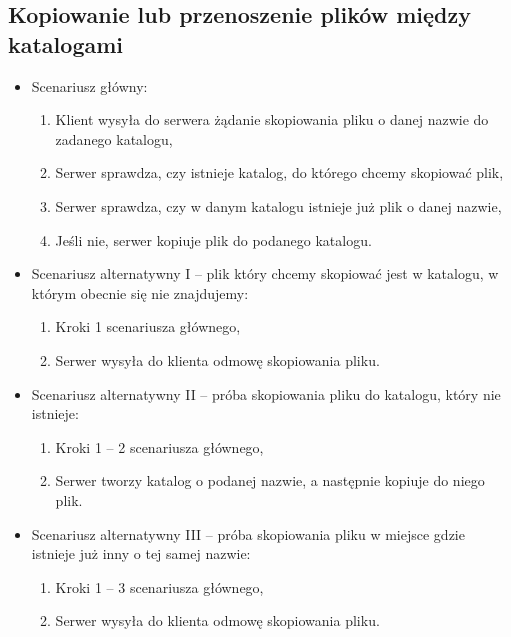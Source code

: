 \documentclass[10pt,a4paper]{article}
\begin{document}
\subsection{Kopiowanie lub przenoszenie plików między katalogami}
\begin{itemize}
    \item Scenariusz główny:
    \begin{enumerate}
        \item Klient wysyła do serwera żądanie skopiowania pliku o danej nazwie do zadanego katalogu,
        \item Serwer sprawdza, czy istnieje katalog, do którego chcemy skopiować plik,
        \item Serwer sprawdza, czy w danym katalogu istnieje już plik o danej nazwie,
        \item Jeśli nie, serwer kopiuje plik do podanego katalogu.
    \end{enumerate}
    
    \item Scenariusz alternatywny I -- plik który chcemy skopiować jest w katalogu, w którym obecnie się nie znajdujemy:
    \begin{enumerate}
        \item Kroki 1  scenariusza głównego,
        \item Serwer wysyła do klienta odmowę skopiowania pliku.
    \end{enumerate}
    
    
    \item Scenariusz alternatywny II -- próba skopiowania pliku do katalogu, który nie istnieje:
    \begin{enumerate}
        \item Kroki 1 -- 2 scenariusza głównego,
        \item Serwer tworzy katalog o podanej nazwie, a następnie kopiuje do niego plik.
    \end{enumerate}
    
    \item Scenariusz alternatywny III -- próba skopiowania pliku w miejsce gdzie istnieje już inny o tej samej nazwie:
    \begin{enumerate}
        \item Kroki 1 -- 3 scenariusza głównego,
        \item Serwer wysyła do klienta odmowę skopiowania pliku.
    \end{enumerate}
\end{itemize}
\end{document}
